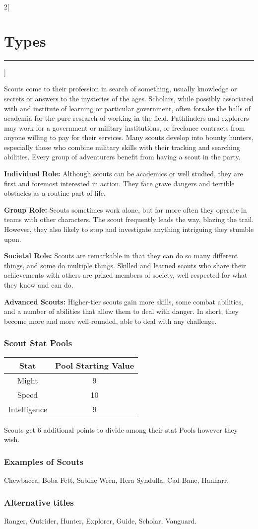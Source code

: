 \documentclass[a4paper,10pt,final]{book}
\newcommand{\HRule}{\rule{\linewidth}{0.5mm}} %
\newcommand{\newSection}[1]{\section*{#1} \addcontentsline{toc}{section}{#1} \label{sec:#1} \HRule}
\newcommand{\statPool}[5]
{
	\subsubsection*{#1 Stat Pools}
	\label{subsub:#1StatPools}
	\begin{center}
	\begin{tabular}{ |c|c| }
	\hline
	\textbf{Stat} & \textbf{Pool Starting Value} \\
	\hline \hline
	Might & #2 \\
	\hline
 	Speed & #3  \\
 	\hline
 	Intelligence & #4  \\
 	\hline
	\end{tabular}
	\end{center}
	#1s get #5 additional points to divide among their stat Pools however they wish.
}
\newcommand{\itemLine}[2]{\textbf{#1:} {#2}\par}
\newenvironment{docsection}[1]
{
  \begin{multicols*}{2}[\newSection{#1}]
}
{
  \end{multicols*}
  \newpage
}
\begin{document}
\begin{docsection}{Types}
Scouts come to their profession in search of something, usually knowledge or secrets or answers to the mysteries of the ages. Scholars, while possibly associated with and institute of learning or particular government, often forsake the halls of academia for the pure research of working in the field. Pathfinders and explorers may work for a government or military institutions, or freelance contracts from anyone willing to pay for their services. Many scouts develop into bounty hunters, especially those who combine military skills with their tracking and searching abilities. Every group of adventurers benefit from having a scout in the party.

\itemLine{Individual Role} {Although scouts can be academics or well studied, they are first and foremost interested in action. They face grave dangers and terrible obstacles as a routine part of life.}

\itemLine{Group Role} {Scouts sometimes work alone, but far more often they operate in teams with other characters. The scout frequently leads the way, blazing the trail. However, they also likely to stop and investigate anything intriguing they stumble upon.}

\itemLine{Societal Role} {Scouts are remarkable in that they can do so many different things, and some do multiple things. Skilled and learned scouts who share their achievements with others are prized members of society, well respected for what they know and can do.}

\itemLine{Advanced Scouts} {Higher-tier scouts gain more skills, some combat abilities, and a number of abilities that allow them to deal with danger. In short, they become more and more well-rounded, able to deal with any challenge.}

\statPool{Scout}{9}{10}{9}{6}

\subsubsection*{Examples of Scouts}
\label{subsub:scoutExamples}

Chewbacca, Boba Fett, Sabine Wren, Hera Syndulla, Cad Bane, Hanharr.

\subsubsection*{Alternative titles}
\label{subsub:scoutAlternative}

Ranger, Outrider, Hunter, Explorer, Guide, Scholar, Vanguard.


\end{docsection}
\end{document}
